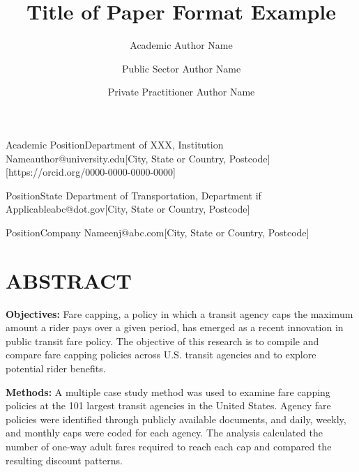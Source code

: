 \documentclass[10pt,numbered]{trbunofficial}
\begin{document}
\title{Title of Paper Format Example}


\author*{Academic Author Name}{Academic Position}{Department of XXX, Institution Name}{author@university.edu}[City, State or Country, Postcode][https://orcid.org/0000-0000-0000-0000]
\author{Public Sector Author Name}{Position}{State Department of Transportation, Department if Applicable}{abc@dot.gov}[City, State or Country, Postcode]
\author{Private Practitioner Author Name}{Position}{Company Name}{enj@abc.com}[City, State or Country, Postcode]



\maketitle

\section*{ABSTRACT}

\begingroup
\setlength{\parindent}{0pt}
\vspace{\baselineskip}

\noindent\textbf{Objectives:} Fare capping, a policy in which a transit agency
caps the maximum amount a rider pays over a given period, has emerged as a
recent innovation in public transit fare policy. The objective of this research
is to compile and compare fare capping policies across U.S. transit agencies
and to explore potential rider benefits.
\par\vspace{\baselineskip}

\noindent\textbf{Methods:} A multiple case study method was used to examine fare
capping policies at the 101 largest transit agencies in the United States.
Agency fare policies were identified through publicly available documents, and
daily, weekly, and monthly caps were coded for each agency. The analysis
calculated the number of one-way adult fares required to reach each cap and
compared the resulting discount patterns.
\par\vspace{\baselineskip}
\end{document}
